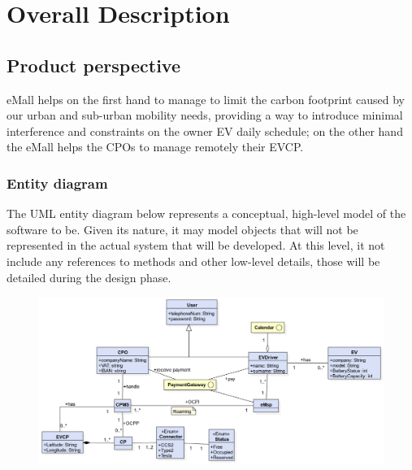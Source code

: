 \section{Overall Description}

\subsection{Product perspective}
eMall helps on the first hand to manage to limit the carbon footprint caused by our urban and sub-urban mobility needs,
providing a way to introduce minimal interference and constraints on the owner EV daily schedule;
on the other hand the eMall helps the CPOs to manage remotely their EVCP.
\vspace{1cm}
\subsubsection{Entity diagram}
The UML entity diagram below represents a conceptual, high-level model of
the software to be. Given its nature, it may model objects that will not
be represented in the actual system that will be developed. At this
level, it not include any references to methods and other low-level
details, those will be detailed during the design phase.
\begin{figure}[H]
      \centering
      \includegraphics[scale=0.4]{src/domain_UML.png}
\end{figure} \vspace{1cm}

